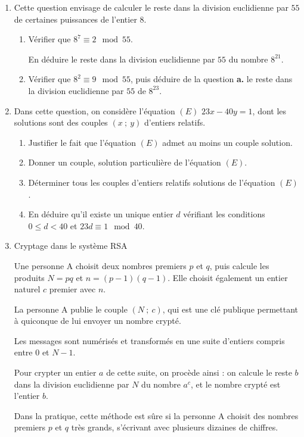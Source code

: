\documentclass[10pt,a4paper]{article}
\begin{document}
\begin{enumerate}
\item Cette question envisage de calculer le reste dans la division euclidienne par $55$ de certaines
puissances de l'entier $8$.
	\begin{enumerate}
		\item Vérifier que $8^7 \equiv 2 \mod 55$.
		
En déduire le reste dans la division euclidienne par $55$ du nombre $8^{21}$.
		\item Vérifier que $8^2 \equiv 9 \mod 55$, puis déduire de la question \textbf{a.} le reste dans la division
euclidienne par $55$ de $8^{23}$.
 	\end{enumerate}
\item  Dans cette question, on considère l'équation $(E)$\: $23 x - 40 y = 1$, dont les solutions sont des
couples $(x~;~y)$ d'entiers relatifs.
	\begin{enumerate}
		\item Justifier le fait que l'équation $(E)$ admet au moins un couple solution.
		\item Donner un couple, solution particulière de l'équation $(E)$.
		\item Déterminer tous les couples d'entiers relatifs solutions de l'équation $(E)$.
		\item En déduire qu'il existe un unique entier $d$ vérifiant les conditions $0 \leqslant d < 40$ et $23 d \equiv  1 \mod 40$.
 	\end{enumerate}
\item  Cryptage dans le système RSA
	
Une personne A choisit deux nombres premiers $p$ et $q$, puis calcule les produits $N = p q$ et
$n = (p - 1)(q - 1)$. Elle choisit également un entier naturel $c$ premier avec $n$.
	
La personne A publie le couple $(N~;~c)$, qui est une clé publique permettant à quiconque de lui
envoyer un nombre crypté.
	
Les messages sont numérisés et transformés en une suite d'entiers compris entre $0$ et $N -1$.
	
Pour crypter un entier $a$ de cette suite, on procède ainsi : on calcule le reste $b$ dans la division
euclidienne par $N$ du nombre $a^c$, et le nombre crypté est l'entier $b$.

\smallskip

Dans la pratique, cette méthode est sûre si la personne A choisit des nombres premiers $p$ et $q$
très grands, s'écrivant avec plusieurs dizaines de chiffres.


\end{enumerate}
\end{document}
